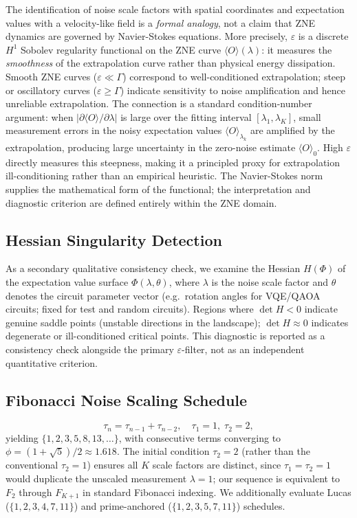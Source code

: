 \documentclass[10pt,letterpaper]{article}
\begin{document}
The identification of noise scale factors with spatial coordinates and
expectation values with a velocity-like field is a \textit{formal analogy},
not a claim that ZNE dynamics are governed by Navier-Stokes equations.
More precisely, $\varepsilon$ is a discrete $H^{1}$ Sobolev
regularity functional on the ZNE curve $\langle O\rangle(\lambda)$:
it measures the \textit{smoothness} of the extrapolation curve rather
than physical energy dissipation.
Smooth ZNE curves ($\varepsilon\ll\Gamma$) correspond to
well-conditioned extrapolation; steep or oscillatory curves
($\varepsilon\geq\Gamma$) indicate sensitivity to noise amplification
and hence unreliable extrapolation.
The connection is a standard condition-number argument: when
$|\partial\langle O\rangle/\partial\lambda|$ is large over the fitting
interval $[\lambda_1,\lambda_K]$, small measurement errors in the
noisy expectation values $\langle O\rangle_{\lambda_k}$ are amplified
by the extrapolation, producing large uncertainty in the zero-noise
estimate $\langle O\rangle_0$.
High $\varepsilon$ directly measures this steepness, making it a
principled proxy for extrapolation ill-conditioning rather than an
empirical heuristic.
The Navier-Stokes norm supplies the mathematical form of the
functional; the interpretation and diagnostic criterion are
defined entirely within the ZNE domain.

\subsection{Hessian Singularity Detection}
As a secondary qualitative consistency check, we examine the Hessian
$H(\Phi)$ of the expectation value surface
$\Phi(\lambda,\theta)$, where $\lambda$ is the noise scale factor and
$\theta$ denotes the circuit parameter vector (e.g.\ rotation angles
for VQE/QAOA circuits; fixed for test and random circuits).
Regions where $\det H < 0$ indicate genuine saddle points (unstable
directions in the landscape); $\det H \approx 0$ indicates degenerate
or ill-conditioned critical points.
This diagnostic is reported as a consistency check alongside the
primary $\varepsilon$-filter, not as an independent quantitative criterion.

\subsection{Fibonacci Noise Scaling Schedule}
\begin{equation}
  \tau_n = \tau_{n-1}+\tau_{n-2},\quad
  \tau_1=1,\;\tau_2=2,
\end{equation}
yielding $\{1,2,3,5,8,13,\ldots\}$, with consecutive terms converging
to $\phi=(1+\sqrt{5})/2\approx 1.618$.
The initial condition $\tau_2=2$ (rather than the conventional
$\tau_2=1$) ensures all $K$ scale factors are distinct, since
$\tau_1=\tau_2=1$ would duplicate the unscaled measurement
$\lambda=1$; our sequence is equivalent to $F_2$ through $F_{K+1}$
in standard Fibonacci indexing.
We additionally evaluate Lucas
($\{1,2,3,4,7,11\}$) and prime-anchored ($\{1,2,3,5,7,11\}$) schedules.
\end{document}
